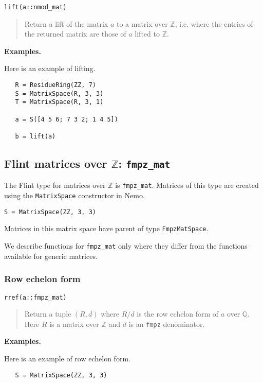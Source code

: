 \documentclass[a4paper,10pt]{article}
\newcommand{\Z}{\mathbb{Z}}
\newcommand{\Q}{\mathbb{Q}}
\newcommand{\code}{\lstinline}
\newcommand{\desc}[1]{\vspace{-3mm}\begin{quote}#1\end{quote}}
\begin{document}
{{\begin{lstlisting}
lift(a::nmod_mat)
\end{lstlisting}

\desc{Return a lift of the matrix $a$ to a matrix over $\Z$, i.e. where the
entries of the returned matrix are those of $a$ lifted to $\Z$.}

\textbf{Examples.}

Here is an example of lifting.

\begin{lstlisting}
   R = ResidueRing(ZZ, 7)
   S = MatrixSpace(R, 3, 3)
   T = MatrixSpace(R, 3, 1)

   a = S([4 5 6; 7 3 2; 1 4 5])
  
   b = lift(a)
\end{lstlisting}

\subsection{Flint matrices over $\Z$: \code{fmpz_mat}}

The Flint type for matrices over $\Z$ is \code{fmpz_mat}. Matrices
of this type are created using the \code{MatrixSpace} constructor in Nemo. 

\begin{lstlisting}
S = MatrixSpace(ZZ, 3, 3)
\end{lstlisting}

Matrices in this matrix space have parent of type \code{FmpzMatSpace}.

We describe functions for \code{fmpz_mat} only where they differ from the functions
available for generic matrices.

\subsubsection{Row echelon form}

\begin{lstlisting}
rref(a::fmpz_mat)
\end{lstlisting}

\desc{Return a tuple $(R, d)$ where $R/d$ is the row echelon form of $a$ over $\Q$.
Here $R$ is a matrix over $\Z$ and $d$ is an \code{fmpz} denominator.}

\textbf{Examples.}

Here is an example of row echelon form.

\begin{lstlisting}
   S = MatrixSpace(ZZ, 3, 3)


\end{lstlisting}}}
\end{document}
